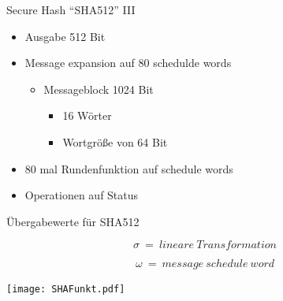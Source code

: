 \documentclass[
  11 pt,
  ignorenonframetext,
  aspectratio=43,
]{beamer}
\providecommand{\tightlist}{%
  \setlength{\itemsep}{0pt}\setlength{\parskip}{0pt}}
\begin{document}
\begin{frame}{Secure Hash ``SHA512'' III}
\protect\hypertarget{secure-hash-sha512-iii}{}
\begin{itemize}
\tightlist
\item
  Ausgabe 512 Bit
\end{itemize}

\pause

\begin{itemize}
\item
  Message expansion auf 80 schedulde words

  \pause

  \begin{itemize}
  \item
    Messageblock 1024 Bit

    \begin{itemize}
    \item
      16 Wörter
    \item
      Wortgröße von 64 Bit
    \end{itemize}
  \end{itemize}
\end{itemize}

\pause

\begin{itemize}
\tightlist
\item
  80 mal Rundenfunktion auf schedule words
\end{itemize}

\pause

\begin{itemize}
\tightlist
\item
  Operationen auf Status
\end{itemize}
\end{frame}

\begin{frame}{Übergabewerte für SHA512}
\protect\hypertarget{uxfcbergabewerte-fuxfcr-sha512}{}

\[ \sigma\  =\ lineare\ Transformation \]

\[ \omega\ =\ message\ schedule\ word \]
\end{frame}

\begin{frame}{}
\protect\hypertarget{section-4}{}
\texttt{[image: SHAFunkt.pdf]}
\end{frame}
\end{document}
